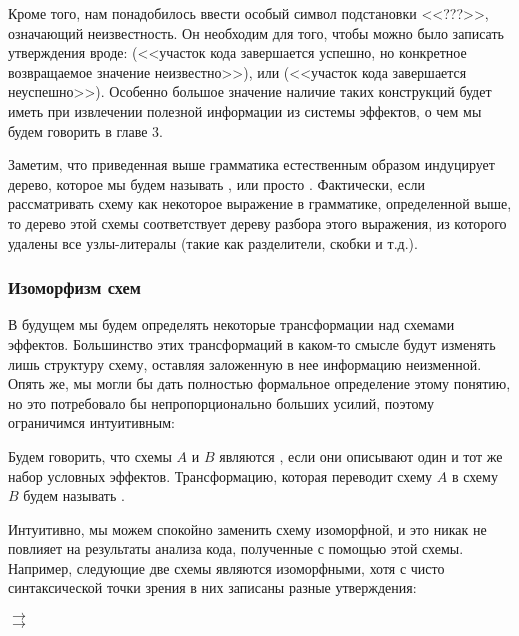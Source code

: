 Кроме того, нам понадобилось ввести особый символ подстановки <<???>>, означающий неизвестность. Он необходим для того, чтобы можно было записать утверждения вроде:  (<<участок кода завершается успешно, но конкретное возвращаемое значение неизвестно>>), или  (<<участок кода завершается неуспешно>>). Особенно большое значение наличие таких конструкций будет иметь при извлечении полезной информации из системы эффектов, о чем мы будем говорить в главе 3.

Заметим, что приведенная выше грамматика естественным образом индуцирует дерево, которое мы будем называть , или просто . Фактически, если рассматривать схему как некоторое выражение в грамматике, определенной выше, то дерево этой схемы соответствует дереву разбора этого выражения, из которого удалены все узлы-литералы (такие как разделители, скобки и т.д.). 


\subsubsection{Изоморфизм схем}

В будущем мы будем определять некоторые трансформации над схемами эффектов. Большинство этих трансформаций в каком-то смысле будут изменять лишь структуру схему, оставляя заложенную в нее информацию неизменной. Опять же, мы могли бы дать полностью формальное определение этому понятию, но это потребовало бы непропорционально больших усилий, поэтому ограничимся интуитивным:

\begin{definition}
    Будем говорить, что схемы $A$ и $B$ являются , если они описывают один и тот же набор условных эффектов. Трансформацию, которая переводит схему $A$ в схему $B$ будем называть .
\end{definition}

Интуитивно, мы можем спокойно заменить схему изоморфной, и это никак не повлияет на результаты анализа кода, полученные с помощью этой схемы. Например, следующие две схемы являются изоморфными, хотя с чисто синтаксической точки зрения в них записаны разные утверждения:

{
       $\rightarrow$  \\
     $\rightarrow$  \\
}{}

\bigskip

